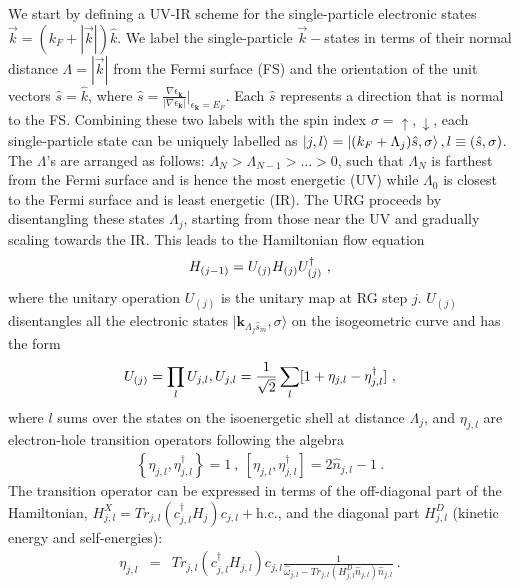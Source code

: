 \documentclass[12pt]{iopart}
\begin{document}
We start by defining a UV-IR scheme for the single-particle electronic states \(\vec k = (k_F + |\vec k|) \hat k\). We label the single-particle \(\vec k-\)states in terms of their normal distance $\Lambda = |\vec k|$ from the Fermi surface (FS) and the orientation of the unit vectors $\hat{s} = \hat k$, where $\hat{s}=\frac{\nabla\epsilon_{\mathbf{k}}}{|\nabla\epsilon_{\mathbf{k}}|}|_{\epsilon_{\mathbf{k}}=E_{F}}$. Each \(\hat s\) represents a direction that is normal to the FS. Combining these two labels with the spin index \(\sigma=\uparrow,\downarrow\), each single-particle state can be uniquely labelled as $\ket{j,l} = \ket{(k_F + \Lambda_j) \hat s,\sigma}, l\equiv (\hat{s},\sigma)$. The $\Lambda$'s are arranged as follows: $\Lambda_{N}>\Lambda_{N-1}>\ldots>0$, such that \(\Lambda_N\) is farthest from the Fermi surface and is hence the most energetic (UV) while \(\Lambda_0\) is closest to the Fermi surface and is least energetic (IR). The URG proceeds by disentangling these states \(\Lambda_j\), starting from those near the UV and gradually scaling towards the IR. This leads to the Hamiltonian flow equation~\cite{anirbanurg1}
\begin{eqnarray}
\centering
\label{urg_map}
H_{(j-1)}=U_{(j)}H_{(j)}U^{\dagger}_{(j)}~,
\end{eqnarray}
where the unitary operation $U_{(j)}$ is the unitary map at RG step $j$. 
$U_{(j)}$ disentangles all the electronic states 
$|\mathbf{k}_{\Lambda_{j}\hat{s}_{m}},\sigma\rangle$
on the isogeometric curve and has the form~\cite{anirbanmott1,anirbanurg1}
\begin{eqnarray}
\centering U_{(j)}=\prod_{l}U_{j,l}, U_{j,l}=\frac{1}{\sqrt{2}}\sum_l [1+\eta_{j,l}-\eta^{\dagger}_{j,l}]~,
\end{eqnarray}
where \(l\) sums over the states on the isoenergetic shell at distance \(\Lambda_j\), and $\eta_{j,l}$ are electron-hole transition operators following the algebra
\begin{eqnarray}
	\left\{\eta_{j,l},\eta_{j,l}^{\dagger}\right\} = 1~,~\left[\eta_{j,l},\eta_{j,l}^{\dagger}\right] = 2\hat n_{j,l} - 1~.
\end{eqnarray}
The transition operator can be expressed in terms of the off-diagonal part of the Hamiltonian, \(H^X_{j,l} = Tr_{j,l}(c^{\dagger}_{j,l}H_{j})c_{j,l} + \text{h.c.}\), and the diagonal part \(H^D_{j,l}\) (kinetic energy and self-energies):
\begin{eqnarray}
	\eta_{j,l}&=&Tr_{j,l}(c^{\dagger}_{j,l}H_{j,l})c_{j,l}\frac{1}{\hat{\omega}_{j,l}-Tr_{j,l}(H^{D}_{j,l}\hat{n}_{j,l})\hat{n}_{j,l}}~.\label{e-TransOp}
\end{eqnarray}
\end{document}
